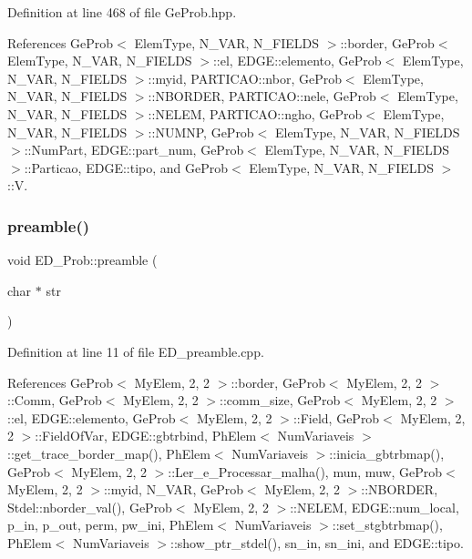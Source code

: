 Definition at line 468 of file Ge\+Prob.\+hpp.



References Ge\+Prob$<$ Elem\+Type, N\+\_\+\+V\+A\+R, N\+\_\+\+F\+I\+E\+L\+D\+S $>$\+::border, Ge\+Prob$<$ Elem\+Type, N\+\_\+\+V\+A\+R, N\+\_\+\+F\+I\+E\+L\+D\+S $>$\+::el, E\+D\+G\+E\+::elemento, Ge\+Prob$<$ Elem\+Type, N\+\_\+\+V\+A\+R, N\+\_\+\+F\+I\+E\+L\+D\+S $>$\+::myid, P\+A\+R\+T\+I\+C\+A\+O\+::nbor, Ge\+Prob$<$ Elem\+Type, N\+\_\+\+V\+A\+R, N\+\_\+\+F\+I\+E\+L\+D\+S $>$\+::\+N\+B\+O\+R\+D\+ER, P\+A\+R\+T\+I\+C\+A\+O\+::nele, Ge\+Prob$<$ Elem\+Type, N\+\_\+\+V\+A\+R, N\+\_\+\+F\+I\+E\+L\+D\+S $>$\+::\+N\+E\+L\+EM, P\+A\+R\+T\+I\+C\+A\+O\+::ngho, Ge\+Prob$<$ Elem\+Type, N\+\_\+\+V\+A\+R, N\+\_\+\+F\+I\+E\+L\+D\+S $>$\+::\+N\+U\+M\+NP, Ge\+Prob$<$ Elem\+Type, N\+\_\+\+V\+A\+R, N\+\_\+\+F\+I\+E\+L\+D\+S $>$\+::\+Num\+Part, E\+D\+G\+E\+::part\+\_\+num, Ge\+Prob$<$ Elem\+Type, N\+\_\+\+V\+A\+R, N\+\_\+\+F\+I\+E\+L\+D\+S $>$\+::\+Particao, E\+D\+G\+E\+::tipo, and Ge\+Prob$<$ Elem\+Type, N\+\_\+\+V\+A\+R, N\+\_\+\+F\+I\+E\+L\+D\+S $>$\+::V.

\mbox{\label{classED__Prob_a2530abb5eba122a90a2bae601893ddfc}} 
\subsubsection{\texorpdfstring{preamble()}{preamble()}}
{\footnotesize\ttfamily void E\+D\+\_\+\+Prob\+::preamble (\begin{DoxyParamCaption}\item[{char $\ast$}]{str }\end{DoxyParamCaption})}



Definition at line 11 of file E\+D\+\_\+preamble.\+cpp.



References Ge\+Prob$<$ My\+Elem, 2, 2 $>$\+::border, Ge\+Prob$<$ My\+Elem, 2, 2 $>$\+::\+Comm, Ge\+Prob$<$ My\+Elem, 2, 2 $>$\+::comm\+\_\+size, Ge\+Prob$<$ My\+Elem, 2, 2 $>$\+::el, E\+D\+G\+E\+::elemento, Ge\+Prob$<$ My\+Elem, 2, 2 $>$\+::\+Field, Ge\+Prob$<$ My\+Elem, 2, 2 $>$\+::\+Field\+Of\+Var, E\+D\+G\+E\+::gbtrbind, Ph\+Elem$<$ Num\+Variaveis $>$\+::get\+\_\+trace\+\_\+border\+\_\+map(), Ph\+Elem$<$ Num\+Variaveis $>$\+::inicia\+\_\+gbtrbmap(), Ge\+Prob$<$ My\+Elem, 2, 2 $>$\+::\+Ler\+\_\+e\+\_\+\+Processar\+\_\+malha(), mun, muw, Ge\+Prob$<$ My\+Elem, 2, 2 $>$\+::myid, N\+\_\+\+V\+AR, Ge\+Prob$<$ My\+Elem, 2, 2 $>$\+::\+N\+B\+O\+R\+D\+ER, Stdel\+::nborder\+\_\+val(), Ge\+Prob$<$ My\+Elem, 2, 2 $>$\+::\+N\+E\+L\+EM, E\+D\+G\+E\+::num\+\_\+local, p\+\_\+in, p\+\_\+out, perm, pw\+\_\+ini, Ph\+Elem$<$ Num\+Variaveis $>$\+::set\+\_\+stgbtrbmap(), Ph\+Elem$<$ Num\+Variaveis $>$\+::show\+\_\+ptr\+\_\+stdel(), sn\+\_\+in, sn\+\_\+ini, and E\+D\+G\+E\+::tipo.

